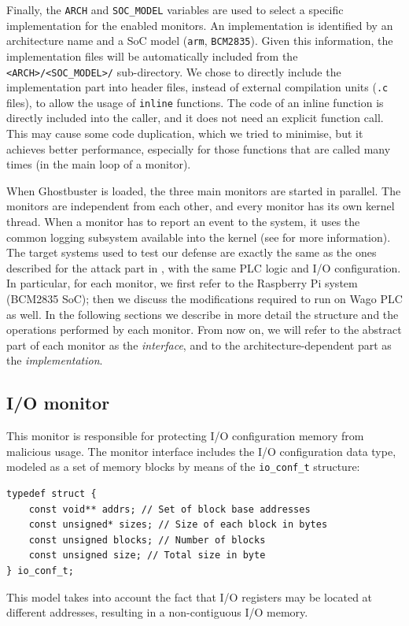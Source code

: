 Finally, the \verb|ARCH| and \verb|SOC_MODEL| variables are used to select a specific implementation for the enabled monitors.
An implementation is identified by an architecture name and a SoC model (\eg \verb|arm|, \verb|BCM2835|). Given this information,
the implementation files will be automatically included from the \verb|<ARCH>/<SOC_MODEL>/| sub-directory.
We chose to directly include the implementation part into header files, instead of external compilation units (\verb|.c| files), to allow the usage of \verb|inline|
functions. The code of an inline function is directly included into the caller, and it does not need an explicit function call.
This may cause some code duplication, which we tried to minimise, but it achieves better performance,
especially for those functions that are called many times (\eg in the main loop of a monitor).

When Ghostbuster is loaded, the three main monitors are started in parallel.
The monitors are independent from each other, and every monitor has its own kernel thread.
When a monitor has to report an event to the system, it uses the common logging subsystem available into the kernel
(see  for more information).
The target systems used to test our defense are exactly the same as the ones described for the attack part in , with the same PLC logic and I/O configuration.
In particular, for each monitor, we first refer to the Raspberry Pi system (BCM2835 SoC); then we discuss the modifications required to run on Wago PLC as well.
In the following sections we describe in more detail the structure and the operations performed by each monitor.
From now on, we will refer to the abstract part of each monitor as the \emph{interface}, and to the architecture-dependent part as the \emph{implementation}.


\subsection{I/O monitor}
\label{sec:io-impl}

This monitor is responsible for protecting I/O configuration memory from malicious usage.
The monitor interface includes the I/O configuration data type, modeled as a set of memory blocks by means of the \verb|io_conf_t| structure:
\begin{lstlisting}
typedef struct {
	const void** addrs; // Set of block base addresses
	const unsigned* sizes; // Size of each block in bytes
	const unsigned blocks; // Number of blocks
	const unsigned size; // Total size in byte
} io_conf_t;
\end{lstlisting}
This model takes into account the fact that I/O registers may be located at different addresses, resulting in a non-contiguous I/O memory.

